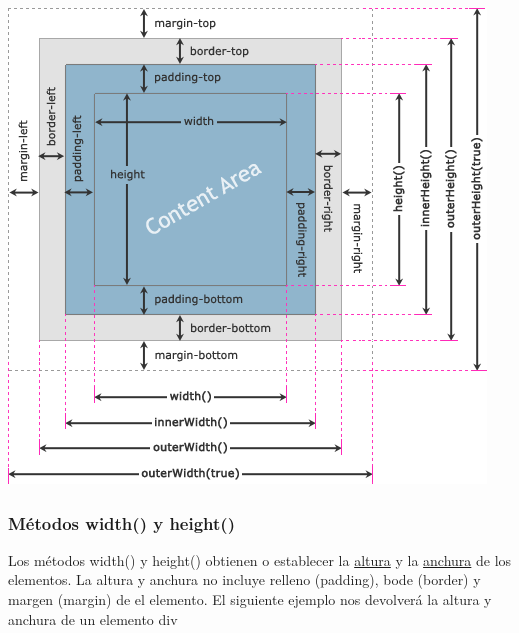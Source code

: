 \documentclass[a4paper, oneside]{article}
\begin{document}
\begin{center}
\includegraphics[width=.9\linewidth]{./img/dimensiones-jquery.png}
\end{center}



\subsubsection{Métodos width() y height()}
\label{sec:org46c253e}

Los métodos width() y height() obtienen o establecer la \uline{altura} y la \uline{anchura} de los elementos. La altura y anchura no incluye relleno (padding), bode (border) y margen (margin) de el elemento. El siguiente ejemplo nos devolverá la altura y anchura de un elemento div
\end{document}
